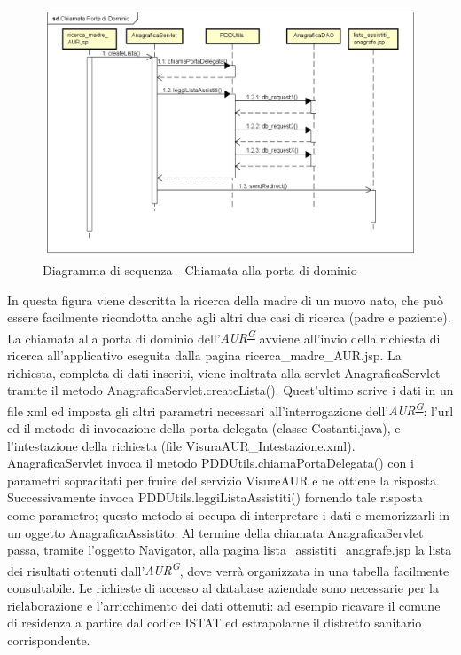 \documentclass[a4paper]{article}
\newcounter{subsubsubsection}[subsubsection]
\begin{document}
\begin{figure}[H]
	\centering
	\includegraphics[width=\linewidth]{uml/chiamataportadidominio.png}
	\caption{Diagramma di sequenza - Chiamata alla porta di dominio}
\end{figure}
In questa figura viene descritta la ricerca della madre di un nuovo nato, che può essere facilmente ricondotta anche agli altri due casi di ricerca (padre e paziente).
\\
La chiamata alla porta di dominio dell'\textit{AUR\textsuperscript{\hyperref[sec:gl]{G}}} avviene all'invio della richiesta di ricerca all'applicativo eseguita dalla pagina ricerca\_madre\_AUR.jsp. La richiesta, completa di dati inseriti, viene inoltrata alla servlet AnagraficaServlet tramite il metodo AnagraficaServlet.createLista(). Quest'ultimo scrive i dati in un file xml ed imposta gli altri parametri necessari all'interrogazione dell'\textit{AUR\textsuperscript{\hyperref[sec:gl]{G}}}: l'url ed il metodo di invocazione della porta delegata (classe Costanti.java), e l'intestazione della richiesta (file VisuraAUR\_Intestazione.xml). AnagraficaServlet invoca il metodo PDDUtils.chiamaPortaDelegata() con i parametri sopracitati per fruire del servizio VisureAUR e ne ottiene la risposta. Successivamente invoca PDDUtils.leggiListaAssistiti() fornendo tale risposta come parametro; questo metodo si occupa di interpretare i dati e memorizzarli in un oggetto AnagraficaAssistito. Al termine della chiamata AnagraficaServlet passa, tramite l'oggetto Navigator, alla pagina lista\_assistiti\_anagrafe.jsp la lista dei risultati ottenuti dall'\textit{AUR\textsuperscript{\hyperref[sec:gl]{G}}}, dove verrà organizzata in una tabella facilmente consultabile. Le richieste di accesso al database aziendale sono necessarie per la rielaborazione e l'arricchimento dei dati ottenuti: ad esempio ricavare il comune di residenza a partire dal codice ISTAT ed estrapolarne il distretto sanitario corrispondente.
\end{document}
